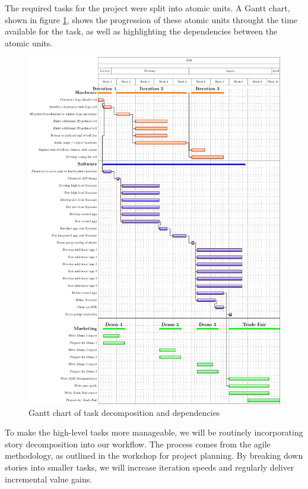 \documentclass{article}
\begin{document}
The required tasks for the project were split into atomic units. A Gantt chart, shown in figure \ref{fig:gantt}, shows the progression of these atomic units throught the time available for the task, as well as highlighting the dependencies between the atomic units.

\begin{figure}[h]
\vskip 5mm
\begin{center}
\centerline{\includegraphics[height=\textheight]{figs/gantttest}}
\caption{Gantt chart of task decomposition and dependencies}
\label{fig:gantt}
\end{center}
\vskip -5mm
\end{figure} 

To make the high-level tasks more manageable, we will be routinely incorporating story decomposition into our workflow. The process comes from the agile methodology, as outlined in the workshop for project planning. By breaking down stories into smaller tasks, we will increase iteration speeds and regularly deliver incremental value gains.
\end{document}
